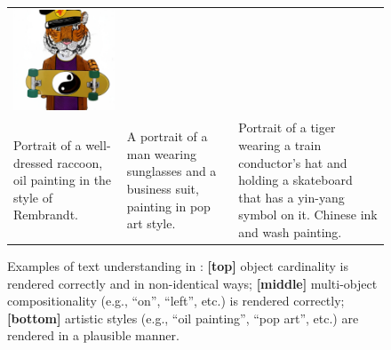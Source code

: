 \begin{figure}
\begin{tabular}{p{50mm}p{50mm}p{50mm}}
    \includegraphics[width=50mm]{figs/verticals/style_01342_maskgit_sresg1r1}
    \\
    \small Portrait of a well-dressed raccoon, oil painting in the style of Rembrandt. &
    \small A portrait of a man wearing sunglasses and a business suit, painting in pop art style. &
    \small Portrait of a tiger wearing a train conductor's hat and holding a skateboard that has a yin-yang symbol on it. Chinese ink and wash painting.
    \\
  \end{tabular}
  \caption{Examples of text understanding in \name: \textbf{[top]} object cardinality is rendered correctly and in non-identical ways; \textbf{[middle]} multi-object compositionality (e.g., ``on'', ``left'', etc.) is rendered correctly; \textbf{[bottom]} artistic styles (e.g.,  ``oil painting'', ``pop art'', etc.) are rendered in a plausible manner.
}

  \label{fig:cardinality_composition_style_examples}
\end{figure}

